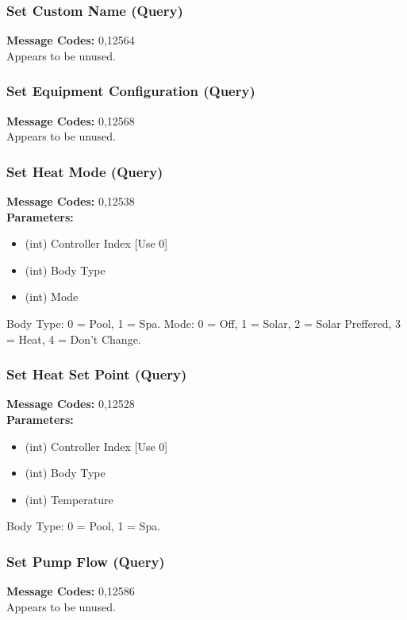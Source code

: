\documentclass[11pt]{article}
\begin{document}
\subsubsection{Set Custom Name (Query)}
\label{msg:12564}
{\bf Message Codes: } 0,12564\\
Appears to be unused.

\subsubsection{Set Equipment Configuration (Query)}
\label{msg:12568}
{\bf Message Codes: } 0,12568\\
Appears to be unused.

\subsubsection{Set Heat Mode (Query)}
\label{msg:12538}
{\bf Message Codes: } 0,12538\\
{\bf Parameters: }
\small
\begin{itemize}
\item (int) Controller Index [Use 0]
\item (int) Body Type
\item (int) Mode
\end{itemize}
\normalsize
Body Type: 0 = Pool, 1 = Spa. Mode: 0 = Off, 1 = Solar, 2 = Solar Preffered, 3 = Heat, 4 = Don't Change.

\subsubsection{Set Heat Set Point (Query)}
\label{msg:12528}
{\bf Message Codes: } 0,12528\\
{\bf Parameters: }
\small
\begin{itemize}
\item (int) Controller Index [Use 0]
\item (int) Body Type
\item (int) Temperature
\end{itemize}
\normalsize
Body Type: 0 = Pool, 1 = Spa.

\subsubsection{Set Pump Flow (Query)}
\label{msg:12586}
{\bf Message Codes: } 0,12586\\
Appears to be unused.
\end{document}
